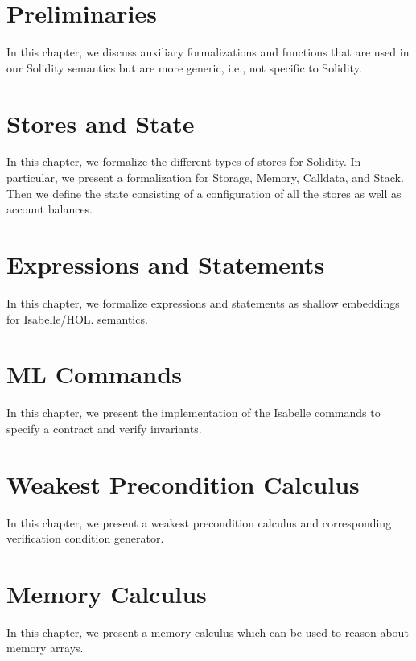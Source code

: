 \documentclass[10pt,DIV17,a4paper,abstract=true,twoside=semi,openright]
{scrreprt}
\begin{document}
\clearpage

\chapter{Preliminaries}
In this chapter, we discuss auxiliary formalizations and functions that
are used in our Solidity semantics but are more generic, i.e., not
specific to Solidity.




\chapter{Stores and State}
In this chapter, we formalize the different types of stores for Solidity.
In particular, we present a formalization for Storage, Memory, Calldata, and Stack.
Then we define the state consisting of a configuration of all the stores as well as account balances.





\chapter{Expressions and Statements}

In this chapter, we formalize expressions and statements as shallow embeddings for Isabelle/HOL.
semantics. 



\chapter{ML Commands}
In this chapter, we present the implementation of the Isabelle commands to specify
a contract and verify invariants.



\chapter{Weakest Precondition Calculus}
In this chapter, we present a weakest precondition calculus and corresponding
verification condition generator.



\chapter{Memory Calculus}
In this chapter, we present a memory calculus which can be used to reason about memory arrays.
\end{document}
